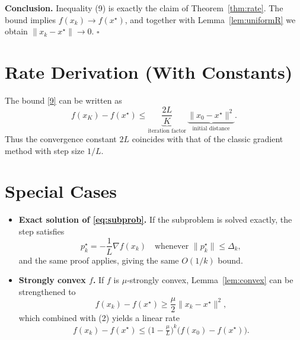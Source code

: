\documentclass{article}
\begin{document}
\noindent\textbf{Conclusion.}  
Inequality (9) is exactly the claim of Theorem~\ref{thm:rate}. The bound implies $f(x_k)\to f(x^\star)$, and together with Lemma~\ref{lem:uniformR} we obtain $\|x_k-x^\star\|\to0$. \hfill $\square$

\section*{Rate Derivation (With Constants)}
The bound \eqref{9} can be written as
\[
f(x_K)-f(x^\star)\le \underbrace{\frac{2L}{K}}_{\text{iteration factor}}\,
\underbrace{\|x_0-x^\star\|^{2}}_{\text{initial distance}} .
\]
Thus the convergence constant $2L$ coincides with that of the classic gradient method with step size $1/L$.

\section*{Special Cases}
\begin{itemize}
\item \textbf{Exact solution of \eqref{eq:subprob}.}  
If the subproblem is solved exactly, the step satisfies
\[
p_k^{\star}= -\frac{1}{L}\nabla f(x_k)\quad\text{whenever }\|p_k^{\star}\|\le\Delta_k,
\]
and the same proof applies, giving the same $O(1/k)$ bound.
\item \textbf{Strongly convex $f$.}  
If $f$ is $\mu$‑strongly convex, Lemma~\ref{lem:convex} can be strengthened to
\[
f(x_k)-f(x^\star)\ge \frac{\mu}{2}\|x_k-x^\star\|^{2},
\]
which combined with (2) yields a linear rate
\[
f(x_k)-f(x^\star)\le \bigl(1-\tfrac{\mu}{L}\bigr)^{k}\bigl(f(x_0)-f(x^\star)\bigr).
\]
\end{itemize}
\end{document}
